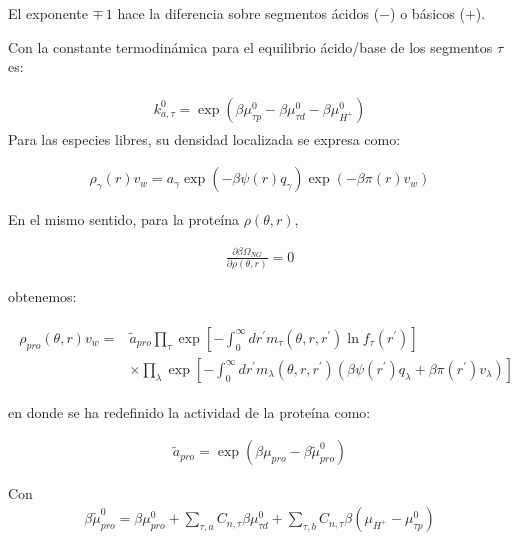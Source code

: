  El exponente $\mp \, 1$ hace la diferencia sobre segmentos \'acidos ($-$) o b\'asicos ($+$).

Con la constante termodin\'amica para el equilibrio \'acido/base de los segmentos $\tau$ es:

\begin{align}
	\begin{aligned}
		k_{a,\tau}^0=\exp\left(\beta\mu_{\tau p}^0 - \beta \mu_{\tau d}^0 - \beta \mu^0_{H^+} \right)
	\end{aligned}
	\label{eq:esf:distau-rxn}
\end{align}
Para las especies libres, su densidad localizada se expresa como:


\begin{align}
	\rho_\gamma(r)v_w = a_\gamma \exp{\left(-\beta \psi(r)q_\gamma\right)} \exp{\left(-\beta\pi(r) v_w\right)}
\end{align}


En el mismo sentido, para la prote\'ina $\rho(\theta,r)$,

\begin{align}
	\frac{\partial \beta \Omega_{NG}}{\partial \rho(\theta,r)} = 0
\end{align}

 obtenemos:
	

\begin{align}
	\begin{aligned}
		\rho_{pro}(\theta, r)v_w = & \tilde{a}_{pro} \prod_\tau \exp\left[ -\int_0^\infty dr^\prime  m_\tau(\theta,r,r^\prime) \ln f_\tau(r^\prime)\right] \\
		& \times \prod_\lambda \exp\left[ -\int_0^\infty dr^\prime  m_\lambda(\theta,r,r^\prime)\left( \beta\psi(r^\prime) q_\lambda + \beta \pi(r^\prime) v_\lambda \right)\right]
	\end{aligned}
	\label{eq:esf:rho-pro}
\end{align}
	
	\noindent en donde se ha redefinido la actividad de la prote\'ina como:
	
	\begin{align}
		\tilde{a}_{pro} = \exp\left(\beta\mu_{pro} - \beta\tilde{\mu}^0_{pro}\right)
	\end{align}

Con
\begin{align}
	\beta\tilde{\mu}^0_{pro} =  \beta \mu^0_{pro}  + \sum_{\tau,a} C_{n,\tau}\beta\mu^0_{\tau d} 
	+ \sum_{\tau,b} C_{n,\tau}\beta(\mu_{H^+} - \mu^0_{\tau p})
\end{align}


